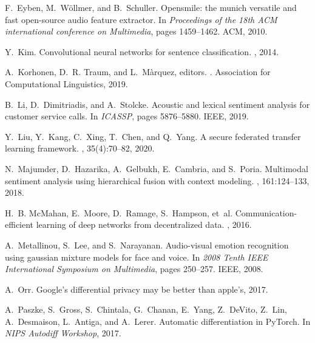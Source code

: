 \documentclass[11pt]{article}
\begin{document}
\begin{thebibliography}{10}
F.~Eyben, M.~W{\"o}llmer, and B.~Schuller.
\newblock Opensmile: the munich versatile and fast open-source audio feature
  extractor.
\newblock In {\em Proceedings of the 18th ACM international conference on
  Multimedia}, pages 1459--1462. ACM, 2010.

Y.~Kim.
\newblock Convolutional neural networks for sentence classification.
, 2014.

A.~Korhonen, D.~R. Traum, and L.~M{\`{a}}rquez, editors.
. Association for Computational Linguistics,
  2019.

B.~Li, D.~Dimitriadis, and A.~Stolcke.
\newblock Acoustic and lexical sentiment analysis for customer service calls.
\newblock In {\em {ICASSP}}, pages 5876--5880. {IEEE}, 2019.

Y.~Liu, Y.~Kang, C.~Xing, T.~Chen, and Q.~Yang.
\newblock A secure federated transfer learning framework.
, 35(4):70--82, 2020.

N.~Majumder, D.~Hazarika, A.~Gelbukh, E.~Cambria, and S.~Poria.
\newblock Multimodal sentiment analysis using hierarchical fusion with context
  modeling.
, 161:124--133, 2018.

H.~B. McMahan, E.~Moore, D.~Ramage, S.~Hampson, et~al.
\newblock Communication-efficient learning of deep networks from decentralized
  data.
, 2016.

A.~Metallinou, S.~Lee, and S.~Narayanan.
\newblock Audio-visual emotion recognition using gaussian mixture models for
  face and voice.
\newblock In {\em 2008 Tenth IEEE International Symposium on Multimedia}, pages
  250--257. IEEE, 2008.

A.~Orr.
\newblock Google’s differential privacy may be better than apple’s, 2017.

A.~Paszke, S.~Gross, S.~Chintala, G.~Chanan, E.~Yang, Z.~DeVito, Z.~Lin,
  A.~Desmaison, L.~Antiga, and A.~Lerer.
\newblock Automatic differentiation in {PyTorch}.
\newblock In {\em NIPS Autodiff Workshop}, 2017.


\end{thebibliography}
\end{document}

